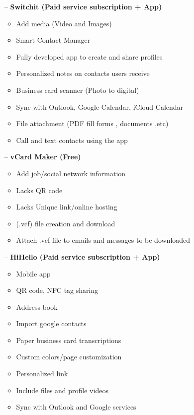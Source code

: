 \documentclass[12pt]{article}%
\begin{document}
\begin{enumerate}[2.a.]
\begin{enumerate}
            \item [--] \textbf{Switchit (Paid service subscription + App)}

            \begin{itemize}
                \item Add media (Video and Images)
                \item Smart Contact Manager
                \item Fully developed app to create and share profiles
                \item Personalized notes on contacts users receive
                \item Business card scanner (Photo to digital)
                \item Sync with Outlook, Google Calendar, iCloud Calendar
                \item File attachment (PDF fill forms , documents ,etc)
                \item Call and text contacts using the app
            \end{itemize}

            \item [--] \textbf{vCard Maker (Free)}
            \begin{itemize}
                \item Add job/social network information
                \item Lacks QR code
                \item Lacks Unique link/online hosting
                \item (.vcf) file creation and download
                \item Attach .vcf file to emails and messages to be downloaded
            \end{itemize}

            \item [--] \textbf{HiHello (Paid service subscription + App)}

            \begin{itemize}
                \item Mobile app
                \item QR code, NFC tag sharing
                \item Address book
                \item Import google contacts
                \item Paper business card transcriptions
                \item Custom colors/page customization
                \item Personalized link
                \item Include files and profile videos
                \item Sync with Outlook and Google services
            \end{itemize}
        \end{enumerate}


\end{enumerate}
\end{document}
